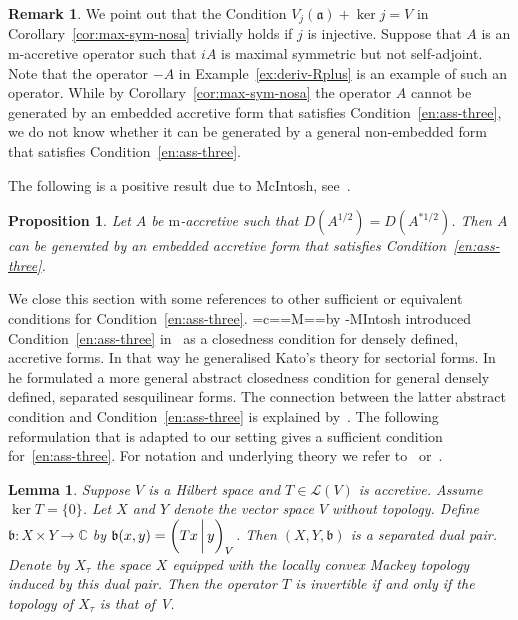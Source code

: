 \documentclass[a4paper,oneside,12pt]{amsart}
\theoremstyle{plain}
\newtheorem{proposition}[theorem]{Proposition}
\newtheorem{lemma}[theorem]{Lemma}
\theoremstyle{definition}
\newtheorem{remark}[theorem]{Remark}
\DeclareRobustCommand{\Mc}{\setbox0=\hbox{c}\mycheight=\ht0\setbox0=\hbox{M}\myMheight=\ht0\mycshift=\myMheight\advance\mycshift by -\mycheight\mbox{M\raisebox{\mycshift}{c}I}}
\DeclareRobustCommand{\McIntosh}{{\Mc}ntosh\xspace}
\begin{document}
\begin{remark}\label{rem:maxsym-ass-three}
We point out that the Condition $V_j({{\mathfrak{{a}}}})+\ker j=V$ in Corollary~\ref{cor:max-sym-nosa} trivially holds if $j$ is injective.
Suppose that $A$ is an {\ensuremath{\text{m}}}-accretive operator such that $iA$ is maximal symmetric but not self-adjoint.
Note that the operator $-A$ in Example~\ref{ex:deriv-Rplus} is an example of such an operator.
While by Corollary~\ref{cor:max-sym-nosa} the operator $A$ cannot be generated by an embedded
accretive form that satisfies Condition~\ref{en:ass-three},
we do not know whether it can be generated 
by a general non-embedded form that satisfies Condition~\ref{en:ass-three}. 
\end{remark}

The following is a positive result due to McIntosh, see~\cite[Section~3, Example~(c)]{McIntosh70:bilinear}.
\begin{proposition}
Let $A$ be {\ensuremath{\text{m}}}-accretive such that $D(A^{1/2})=D(A^{*1/2})$. Then $A$ can be generated by an embedded accretive form that satisfies Condition~\ref{en:ass-three}.
\end{proposition}

We close this section with some references to other sufficient or equivalent conditions for Condition~\ref{en:ass-three}.
\McIntosh introduced Condition~\ref{en:ass-three} in~\cite{McIntosh1968:repres} as a closedness condition for densely defined, accretive forms.
In that way he generalised Kato's theory for sectorial forms. In~\cite{McIntosh70:bilinear} he formulated a more general abstract closedness condition for general densely defined, separated sesquilinear forms.
The connection between the latter abstract condition and Condition~\ref{en:ass-three} is explained by~\cite[Proposition~3.3 and Theorem~3.4]{McIntosh70:bilinear}.
The following reformulation that is adapted to our setting
gives a sufficient condition for~\ref{en:ass-three}.
For notation and underlying theory we refer to~\cite[Section~2]{McIntosh70:bilinear} or~\cite[Chapter~IV]{Schaefer71}.
\begin{lemma}
Suppose $V$ is a Hilbert space and $T\in{\mathcal{L}}(V)$ is accretive. Assume $\ker T=\{0\}$.
Let $X$ and $Y$ denote the vector space $V$ without topology. Define ${{\mathfrak{{b}}}}\colon X\times Y\to{\mathbb{C}}$ by ${{\mathfrak{{b}}}}(x,y)={{\ifthenelse{\equal{auto}{auto}}{\left({Tx}\mkern3mu{\biggm|}\mkern3mu {y}\right)}{}
\ifthenelse{\equal{auto}{b}}{\bigl({Tx}\mkern3mu{\biggm|}\mkern3mu {y}\bigr)}{}
\ifthenelse{\equal{auto}{B}}{\Bigl({Tx}\mkern3mu{\bigm|}\mkern3mu {y}\Bigr)}{}
}}_V$.
Then $(X,Y,{{\mathfrak{{b}}}})$ is a separated dual pair. Denote by $X_\tau$ the space $X$ equipped with the
locally convex Mackey topology induced by this dual pair.
Then the operator $T$ is invertible if and only if the topology of $X_\tau$ is that of~$V$.
\end{lemma}
\end{document}
